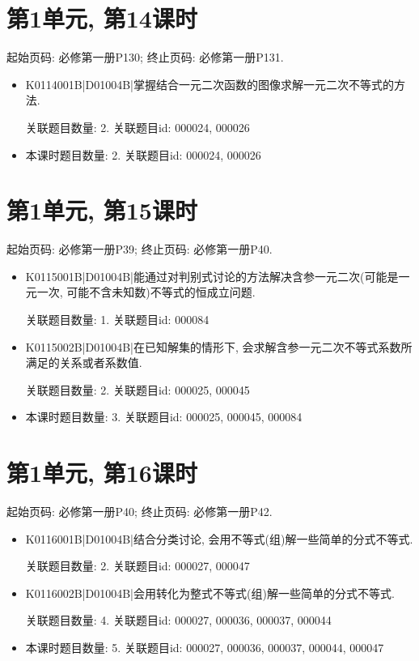 \section*{第1单元, 第14课时}
起始页码: 必修第一册P130; 终止页码: 必修第一册P131.
\begin{itemize}
\item K0114001B|D01004B|掌握结合一元二次函数的图像求解一元二次不等式的方法.

关联题目数量: 2. 关联题目id: 000024, 000026

\item 本课时题目数量: 2. 关联题目id: 000024, 000026

\end{itemize}

\section*{第1单元, 第15课时}
起始页码: 必修第一册P39; 终止页码: 必修第一册P40.
\begin{itemize}
\item K0115001B|D01004B|能通过对判别式讨论的方法解决含参一元二次(可能是一元一次, 可能不含未知数)不等式的恒成立问题.

关联题目数量: 1. 关联题目id: 000084

\item K0115002B|D01004B|在已知解集的情形下, 会求解含参一元二次不等式系数所满足的关系或者系数值.

关联题目数量: 2. 关联题目id: 000025, 000045

\item 本课时题目数量: 3. 关联题目id: 000025, 000045, 000084

\end{itemize}

\section*{第1单元, 第16课时}
起始页码: 必修第一册P40; 终止页码: 必修第一册P42.
\begin{itemize}
\item K0116001B|D01004B|结合分类讨论, 会用不等式(组)解一些简单的分式不等式.

关联题目数量: 2. 关联题目id: 000027, 000047

\item K0116002B|D01004B|会用转化为整式不等式(组)解一些简单的分式不等式.

关联题目数量: 4. 关联题目id: 000027, 000036, 000037, 000044

\item 本课时题目数量: 5. 关联题目id: 000027, 000036, 000037, 000044, 000047

\end{itemize}

